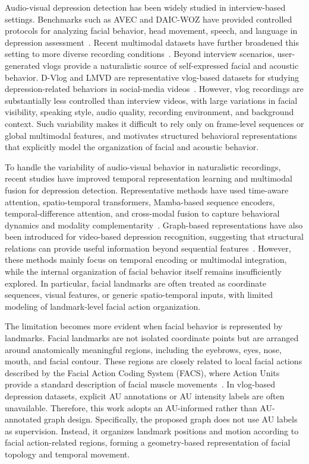 \documentclass[conference]{IEEEtran}
\begin{document}
Audio-visual depression detection has been widely studied in interview-based settings. Benchmarks such as AVEC and DAIC-WOZ have provided controlled protocols for analyzing facial behavior, head movement, speech, and language in depression assessment~\cite{valstar2014avec,gratch2014daic,ringeval2017avec}. Recent multimodal datasets have further broadened this setting to more diverse recording conditions~\cite{zou2023cmdc,uddin2023deep}. Beyond interview scenarios, user-generated vlogs provide a naturalistic source of self-expressed facial and acoustic behavior. D-Vlog and LMVD are representative vlog-based datasets for studying depression-related behaviors in social-media videos~\cite{yoon2022dvlog,he2024lmvd}.
However, vlog recordings are substantially less controlled than interview videos, with large variations in facial visibility, speaking style, audio quality, recording environment, and background context. Such variability makes it difficult to rely only on frame-level sequences or global multimodal features, and motivates structured behavioral representations that explicitly model the organization of facial and acoustic behavior.

To handle the variability of audio-visual behavior in naturalistic recordings, recent studies have improved temporal representation learning and multimodal fusion for depression detection. Representative methods have used time-aware attention, spatio-temporal transformers, Mamba-based sequence encoders, temporal-difference attention, and cross-modal fusion to capture behavioral dynamics and modality complementarity~\cite{zhou2023tamfn,tao2024depmstat,xing2024emomamba,liu2024mddmamba,hu2024sedcfn,jia2024bmbrt,zhang2024mtdan,zhao2025decoupled}. Graph-based representations have also been introduced for video-based depression recognition, suggesting that structural relations can provide useful information beyond  sequential features~\cite{xu2025twostage}.  However, these methods mainly focus on temporal encoding or multimodal integration, while the internal organization of facial behavior itself remains insufficiently explored. 
In particular, facial landmarks are often treated as coordinate sequences, visual features, or generic spatio-temporal inputs, with limited modeling of landmark-level facial action organization.

The limitation becomes more evident when facial behavior is represented by landmarks. Facial landmarks are not isolated coordinate points but are arranged around anatomically meaningful regions, including the eyebrows, eyes, nose, mouth, and facial contour. These regions are closely related to local facial actions described by the Facial Action Coding System (FACS), where Action Units  provide a standard description of facial muscle movements~\cite{ekman1978facs,baltrusaitis2016openface,baltrusaitis2018openface}. 
In vlog-based depression datasets, explicit AU annotations or AU intensity labels are often unavailable. Therefore, this work adopts an AU-informed rather than AU-annotated graph design.
Specifically, the proposed graph does not use AU labels as supervision. 
Instead, it organizes landmark positions and motion according to facial action-related regions, forming a geometry-based representation of facial topology and temporal movement.
\end{document}
